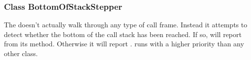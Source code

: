 \subsubsection{Class BottomOfStackStepper}


The  doesn't actually walk through any type of call frame.
Instead it attempts to detect whether the bottom of the call stack has been
reached. If so,  will report  from its
 method. Otherwise it will report .
runs with a higher priority than any other  class.

